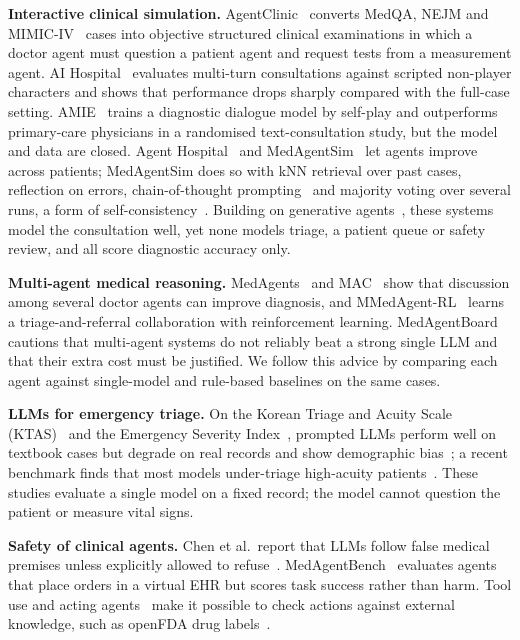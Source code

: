 \documentclass[conference]{IEEEtran}
\begin{document}
\textbf{Interactive clinical simulation.} AgentClinic~\cite{schmidgall2024agentclinic} converts MedQA,
NEJM and MIMIC-IV~\cite{johnson2023mimiciv} cases into objective structured clinical examinations in
which a doctor agent must question a patient agent and request tests from a measurement agent.
AI Hospital~\cite{fan2025aihospital} evaluates multi-turn consultations against scripted
non-player characters and shows that performance drops sharply compared with the full-case
setting. AMIE~\cite{tu2025amie} trains a diagnostic dialogue model by self-play and outperforms
primary-care physicians in a randomised text-consultation study, but the model and data are
closed. Agent Hospital~\cite{li2024agenthospital} and MedAgentSim~\cite{almansoori2025medagentsim}
let agents improve across patients; MedAgentSim does so with kNN retrieval over past cases,
reflection on errors, chain-of-thought prompting~\cite{wei2022cot} and majority voting over several runs, a form of self-consistency~\cite{wang2023selfconsistency}. Building on
generative agents~\cite{park2023generative}, these systems model the consultation well, yet none
models triage, a patient queue or safety review, and all score diagnostic accuracy only.

\textbf{Multi-agent medical reasoning.} MedAgents~\cite{tang2024medagents} and MAC~\cite{chen2025mac}
show that discussion among several doctor agents can improve diagnosis, and MMedAgent-RL~\cite{xia2026mmedagentrl}
learns a triage-and-referral collaboration with reinforcement learning. MedAgentBoard~\cite{zhu2025medagentboard}
cautions that multi-agent systems do not reliably beat a strong single LLM and that their extra
cost must be justified. We follow this advice by comparing each agent against single-model and
rule-based baselines on the same cases.

\textbf{LLMs for emergency triage.} On the Korean Triage and Acuity Scale (KTAS)~\cite{moon2019ktas}
and the Emergency Severity Index~\cite{gilboy2020esi}, prompted LLMs perform well on textbook cases
but degrade on real records and show demographic bias~\cite{lee2025edtriagebias}; a recent benchmark
finds that most models under-triage high-acuity patients~\cite{npjai2026emergency}. These studies
evaluate a single model on a fixed record; the model cannot question the patient or measure vital signs.

\textbf{Safety of clinical agents.} Chen et al.\ report that LLMs follow false medical premises
unless explicitly allowed to refuse~\cite{chen2025sycophancy}. MedAgentBench~\cite{jiang2025medagentbench}
evaluates agents that place orders in a virtual EHR but scores task success rather than harm. Tool
use and acting agents~\cite{yao2023react} make it possible to check actions against external
knowledge, such as openFDA drug labels~\cite{kasshout2016openfda}.
\end{document}
